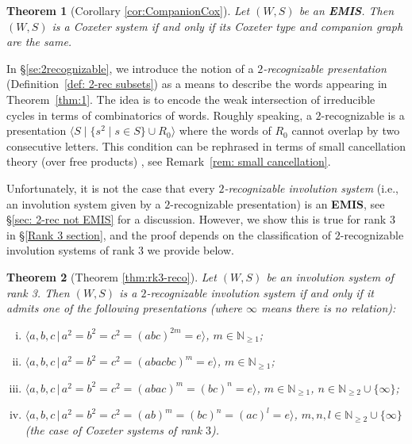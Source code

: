 \documentclass[A4paper, oneside]{amsart}
\newcommand{\N}{\mathbb{N}}
\newcommand{\id}{\textit{e}}
\newcommand{\EMIS}{\textnormal{\bf EMIS}\xspace}
\newtheorem{thm}{Theorem}[section]
\theoremstyle{definition}
\begin{document}
\begin{thm}[Corollary \ref{cor:CompanionCox}]
	Let $(W,S)$ be an \EMIS. Then $(W,S)$ is a Coxeter system if and only if its Coxeter type and companion graph are the same. 
\end{thm}

In \S\ref{se:2recognizable}, we introduce the notion of a {\em $2$-recognizable presentation} (Definition~\ref{def: 2-rec subsets}) as a means to describe the words appearing in Theorem~\ref{thm:1}. The idea is to encode the weak intersection of irreducible cycles in terms of combinatorics of words. Roughly speaking, a $2$-recognizable is a presentation $\langle S \mid \{s^2 \mid s \in S\} \cup R_0 \rangle$ where the words of $R_0$ cannot overlap by two consecutive letters. This condition can be rephrased in terms of small cancellation theory (over free products) \cite{LyndonScupp}, see Remark~\ref{rem: small cancellation}. 

Unfortunately, it is not the case that every \emph{$2$-recognizable involution system} (i.e., an involution system given by a $2$-recognizable presentation) is an \EMIS, see \S\ref{sec: 2-rec not EMIS} for a discussion. However, we show this is true for rank $3$ in \S\ref{Rank 3 section}, and the proof depends on the classification of $2$-recognizable involution systems of rank 3 we provide below.

\begin{thm}[Theorem \ref{thm:rk3-reco}]
	\label{thm: 2-rec intro}
	Let $(W,S)$ be an involution system of rank 3. Then $(W,S)$ is a $2$-recognizable involution system if and only if it admits one of the following presentations (where $\infty$ means there is no relation): 
	\begin{enumerate}[(i)]
		\item $\langle a,b,c \, | \, a^2=b^2=c^2 = (abc)^{2m}=\id\rangle$, $m \in \N_{\geq 1}$;
		
		\item $\langle a,b,c \, | \, a^2=b^2=c^2 = (abacbc)^{m}=\id \rangle$, $m \in \N_{\geq 1}$;
		
		\item $\langle a,b,c \, | \, a^2=b^2=c^2 = (abac)^m=(bc)^n=\id\rangle$, $m \in \N_{\geq 1}$, $n \in \N_{\geq 2} \cup \{\infty\}$; 
		
		\item $\langle a,b,c \, | \, a^2=b^2=c^2 = (ab)^m=(bc)^n=(ac)^l=\id\rangle$, $m,n,l \in \N_{\geq 2} \cup \{\infty\}$ (the case of Coxeter systems of rank $3$).
		
	\end{enumerate}    
\end{thm}  
\end{document}
